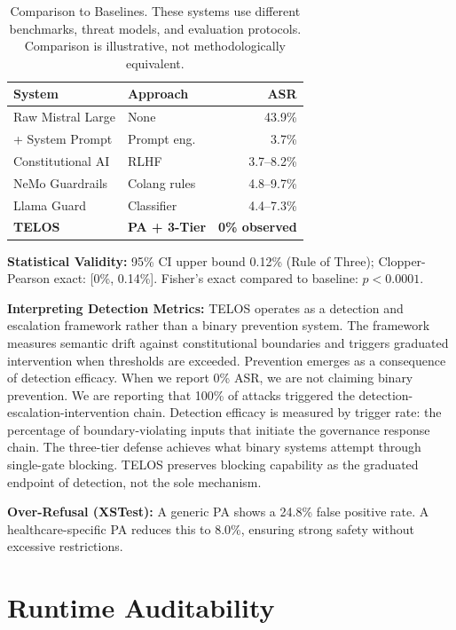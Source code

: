 \documentclass[11pt,twocolumn]{article}
\begin{document}
\begin{table}[t]
\centering
\small
\caption{Comparison to Baselines. These systems use different benchmarks, threat models, and evaluation protocols. Comparison is illustrative, not methodologically equivalent.}
\begin{tabular}{@{}llr@{}}
\toprule
\textbf{System} & \textbf{Approach} & \textbf{ASR} \\
\midrule
Raw Mistral Large & None & 43.9\% \\
\quad + System Prompt & Prompt eng. & 3.7\% \\
Constitutional AI & RLHF & 3.7--8.2\% \\
NeMo Guardrails & Colang rules & 4.8--9.7\% \\
Llama Guard & Classifier & 4.4--7.3\% \\
\textbf{TELOS} & \textbf{PA + 3-Tier} & \textbf{0\% observed} \\
\bottomrule
\end{tabular}
\end{table}

\textbf{Statistical Validity:} 95\% CI upper bound 0.12\% (Rule of Three); Clopper-Pearson exact: [0\%, 0.14\%]. Fisher's exact compared to baseline: $p < 0.0001$.

\textbf{Interpreting Detection Metrics:} TELOS operates as a detection and escalation framework rather than a binary prevention system. The framework measures semantic drift against constitutional boundaries and triggers graduated intervention when thresholds are exceeded. Prevention emerges as a consequence of detection efficacy. When we report 0\% ASR, we are not claiming binary prevention. We are reporting that 100\% of attacks triggered the detection-escalation-intervention chain. Detection efficacy is measured by trigger rate: the percentage of boundary-violating inputs that initiate the governance response chain. The three-tier defense achieves what binary systems attempt through single-gate blocking. TELOS preserves blocking capability as the graduated endpoint of detection, not the sole mechanism.

\textbf{Over-Refusal (XSTest):} A generic PA shows a 24.8\% false positive rate. A healthcare-specific PA reduces this to 8.0\%, ensuring strong safety without excessive restrictions.

\section{Runtime Auditability}
\end{document}

